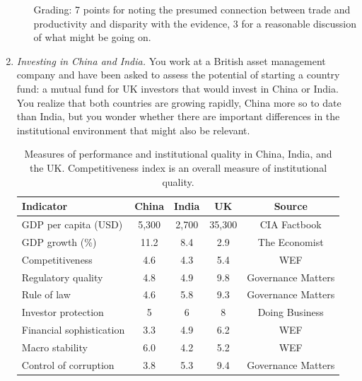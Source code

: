 \documentclass[letterpaper,12pt]{article}
\begin{document}
\begin{enumerate}
\begin{enumerate}
Grading: 7 points for noting the presumed connection 
between trade and productivity and disparity with the evidence, 
3 for a reasonable discussion of what might be going on.  

\end{enumerate}


\item {\it Investing in China and India.\/} 
You work at a British asset management company and have been asked to 
assess the potential of starting a country fund:  
a mutual fund for UK investors 
that would invest in China or India.  
You realize that both countries are growing rapidly, 
China more so to date than India, 
but you wonder whether there are important 
differences in the institutional environment 
that might also be relevant.  

%
 \begin{table}
    \centering
    \begin{tabular}{lcccc}
    \hline\hline
    Indicator    &  China   &  India  &    UK   &  Source \\
    \hline\hline
    GDP per capita (USD) &  5,300  &  2,700 &  35,300  &  CIA Factbook \\
    GDP growth (\%)    &  11.2  &   8.4   &  2.9  &  The Economist \\
    Competitiveness  &  4.6    &  4.3   &  5.4  &  WEF \\
    Regulatory quality &  4.8 &  4.9  &  9.8  &  Governance Matters \\
    Rule of law   &  4.6  &  5.8  &  9.3  &  Governance Matters  \\
    Investor protection & 5  & 6  &  8  &  Doing Business \\
    Financial sophistication  &  3.3  &  4.9  &  6.2  &  WEF \\
    Macro stability    &  6.0  &  4.2  &  5.2  &  WEF  \\
    Control of corruption    & 3.8  &  5.3  &  9.4  & Governance Matters\\
    \hline\hline
    \end{tabular}
    \caption{Measures of performance and institutional quality 
    in China, India, and the UK.
    Competitiveness index is an overall measure of institutional quality.}
    \label{tab:institutions}
\end{table}


\end{enumerate}
\end{document}
